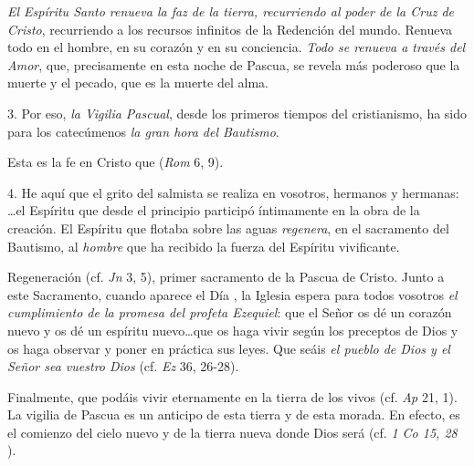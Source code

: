 \begin{body}
\textit{El Espíritu Santo renueva la faz de la tierra, recurriendo al poder de la Cruz de Cristo}, recurriendo a los recursos infinitos de la Redención del mundo. Renueva todo en el hombre, en su corazón y en su conciencia. \textit{Todo se renueva a través del Amor}, que, precisamente en esta noche de Pascua, se revela más poderoso que la muerte y el pecado, que es la muerte del alma. 

3. Por eso, \textit{la Vigilia Pascual}, desde los primeros tiempos del cristianismo, ha sido para los catecúmenos \textit{la gran hora del Bautismo}. 


Esta es la fe en Cristo que  (\textit{Rom} 6, 9). 

4. He aquí que el grito del salmista se realiza en vosotros, hermanos y hermanas: \ldots el Espíritu que desde el principio participó íntimamente en la obra de la creación. El Espíritu que flotaba sobre las aguas \textit{regenera}, en el sacramento del Bautismo, al \textit{hombre } que ha recibido la fuerza del Espíritu vivificante. 

Regeneración  (cf. \textit{Jn} 3, 5), primer sacramento de la Pascua de Cristo. Junto a este Sacramento, cuando aparece el Día , la Iglesia espera para todos vosotros \textit{el cumplimiento de la promesa del profeta Ezequiel}: que el Señor os dé un corazón nuevo y os dé un espíritu nuevo\ldots que os haga vivir según los preceptos de Dios y os haga observar y poner en práctica sus leyes. Que seáis \textit{el pueblo de Dios y el Señor sea vuestro Dios} (cf. \textit{Ez} 36, 26-28). 

Finalmente, que podáis vivir eternamente en la tierra de los vivos (cf. \textit{Ap} 21, 1). La vigilia de Pascua es un anticipo de esta tierra y de esta morada. En efecto, es el comienzo del cielo nuevo y de la tierra nueva donde Dios será  (cf. \textit{1 Co 15, 28} ).
\end{body}

